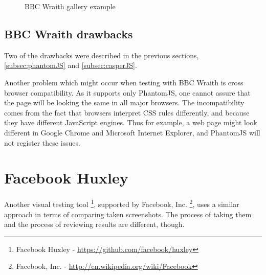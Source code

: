 \documentclass[11pt,oneside,final]{fithesis2}
\begin{document}
  
  \begin{figure}[!htb]
    \begin{center}
    \leavevmode
    \centerline{}
    \end{center}
    \caption{BBC Wraith gallery example~\citep{bbc_wraith_gallery_example}}
    \label{fig:bbcGallery} 
  \end{figure}

    \subsection{BBC Wraith drawbacks}
    Two of the drawbacks were described in the previous sections, \ref{subsec:phantomJS} and \ref{subsec:casperJS}.
    
    Another problem which might occur when testing with BBC Wraith is cross browser compatibility. As it supports only PhantomJS, one cannot assure that the page will be 
    looking the same in all major browsers. The incompatibility comes from the fact that browsers interpret CSS rules differently, and because they have different JavaScript engines. 
    Thus for example, a web page might look different in Google Chrome and Microsoft Internet Explorer, and PhantomJS will not register these issues.

  \section{Facebook Huxley}
  Another visual testing tool \footnote{Facebook Huxley - \url{https://github.com/facebook/huxley}}, supported by Facebook, Inc. \footnote{Facebook, Inc. - \url{http://en.wikipedia.org/wiki/Facebook}}, uses a similar approach in terms of comparing taken screenshots. The process of taking them and the process
  of reviewing results are different, though.
  
\end{document}
